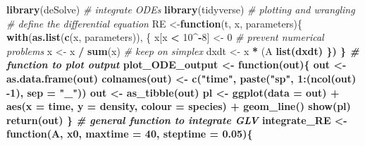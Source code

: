 \documentclass[]{book}
\newenvironment{Shaded}{\begin{snugshade}}{\end{snugshade}}
\newcommand{\CommentTok}[1]{\textcolor[rgb]{0.56,0.35,0.01}{\textit{#1}}}
\newcommand{\ControlFlowTok}[1]{\textcolor[rgb]{0.13,0.29,0.53}{\textbf{#1}}}
\newcommand{\DataTypeTok}[1]{\textcolor[rgb]{0.13,0.29,0.53}{#1}}
\newcommand{\DecValTok}[1]{\textcolor[rgb]{0.00,0.00,0.81}{#1}}
\newcommand{\FloatTok}[1]{\textcolor[rgb]{0.00,0.00,0.81}{#1}}
\newcommand{\KeywordTok}[1]{\textcolor[rgb]{0.13,0.29,0.53}{\textbf{#1}}}
\newcommand{\NormalTok}[1]{#1}
\newcommand{\OperatorTok}[1]{\textcolor[rgb]{0.81,0.36,0.00}{\textbf{#1}}}
\newcommand{\StringTok}[1]{\textcolor[rgb]{0.31,0.60,0.02}{#1}}
\begin{document}
\begin{Shaded}
\begin{Highlighting}[]
\KeywordTok{library}\NormalTok{(deSolve) }\CommentTok{# integrate ODEs}
\KeywordTok{library}\NormalTok{(tidyverse) }\CommentTok{# plotting and wrangling}
\CommentTok{# define the differential equation}
\NormalTok{RE <-}\ControlFlowTok{function}\NormalTok{(t, x, parameters)\{}
  \KeywordTok{with}\NormalTok{(}\KeywordTok{as.list}\NormalTok{(}\KeywordTok{c}\NormalTok{(x, parameters)), \{}
\NormalTok{    x[x }\OperatorTok{<}\StringTok{ }\DecValTok{10}\OperatorTok{^-}\DecValTok{8}\NormalTok{] <-}\StringTok{ }\DecValTok{0} \CommentTok{# prevent numerical problems}
\NormalTok{    x <-}\StringTok{ }\NormalTok{x }\OperatorTok{/}\StringTok{ }\KeywordTok{sum}\NormalTok{(x) }\CommentTok{# keep on simplex}
\NormalTok{    dxdt <-}\StringTok{ }\NormalTok{x }\OperatorTok{*}\StringTok{ }\NormalTok{(A }\OperatorTok{%
    \KeywordTok{list}\NormalTok{(dxdt)}
\NormalTok{  \})}
\NormalTok{\}}
\CommentTok{# function to plot output}
\NormalTok{plot_ODE_output <-}\StringTok{ }\ControlFlowTok{function}\NormalTok{(out)\{}
\NormalTok{  out <-}\StringTok{ }\KeywordTok{as.data.frame}\NormalTok{(out)}
  \KeywordTok{colnames}\NormalTok{(out) <-}\StringTok{ }\KeywordTok{c}\NormalTok{(}\StringTok{"time"}\NormalTok{, }\KeywordTok{paste}\NormalTok{(}\StringTok{"sp"}\NormalTok{, }\DecValTok{1}\OperatorTok{:}\NormalTok{(}\KeywordTok{ncol}\NormalTok{(out) }\DecValTok{-1}\NormalTok{), }\DataTypeTok{sep =} \StringTok{"_"}\NormalTok{))}
\NormalTok{  out <-}\StringTok{ }\KeywordTok{as_tibble}\NormalTok{(out) }\OperatorTok{%
\NormalTok{  pl <-}\StringTok{ }\KeywordTok{ggplot}\NormalTok{(}\DataTypeTok{data =}\NormalTok{ out) }\OperatorTok{+}\StringTok{ }
\StringTok{    }\KeywordTok{aes}\NormalTok{(}\DataTypeTok{x =}\NormalTok{ time, }\DataTypeTok{y =}\NormalTok{ density, }\DataTypeTok{colour =}\NormalTok{ species) }\OperatorTok{+}\StringTok{ }
\StringTok{    }\KeywordTok{geom_line}\NormalTok{()}
  \KeywordTok{show}\NormalTok{(pl)}
  \KeywordTok{return}\NormalTok{(out)}
\NormalTok{\}}
\CommentTok{# general function to integrate GLV}
\NormalTok{integrate_RE <-}\StringTok{ }\ControlFlowTok{function}\NormalTok{(A, x0, }\DataTypeTok{maxtime =} \DecValTok{40}\NormalTok{, }\DataTypeTok{steptime =} \FloatTok{0.05}\NormalTok{)\{}
}}
\end{Highlighting}
\end{Shaded}
\end{document}

